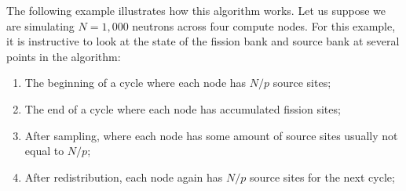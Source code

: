The following example illustrates how this algorithm works. Let us
suppose we are simulating $N = 1,000$ neutrons across four compute
nodes. For this example, it is instructive to look at the state of the
fission bank and source bank at several points in the algorithm:
\begin{enumerate}
\item The beginning of a cycle where each node has $N/p$ source sites;
\item The end of a cycle where each node has accumulated fission sites;
\item After sampling, where each node has some amount of source sites
  usually not equal to $N/p$;
\item After redistribution, each node again has $N/p$ source sites for
  the next cycle;
\end{enumerate}

